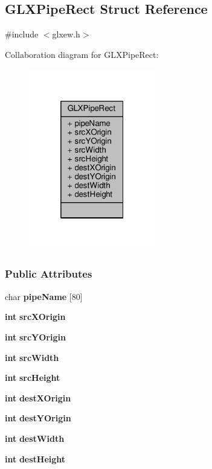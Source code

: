 \subsection{G\+L\+X\+Pipe\+Rect Struct Reference}
\label{structGLXPipeRect}


{\ttfamily \#include $<$glxew.\+h$>$}



Collaboration diagram for G\+L\+X\+Pipe\+Rect\+:
\nopagebreak
\begin{figure}[H]
\begin{center}
\leavevmode
\includegraphics[width=157pt]{d4/dcc/structGLXPipeRect__coll__graph}
\end{center}
\end{figure}
\subsubsection*{Public Attributes}
\begin{DoxyCompactItemize}
\item 
char {\bf pipe\+Name} [80]
\item 
{\bf int} {\bf src\+X\+Origin}
\item 
{\bf int} {\bf src\+Y\+Origin}
\item 
{\bf int} {\bf src\+Width}
\item 
{\bf int} {\bf src\+Height}
\item 
{\bf int} {\bf dest\+X\+Origin}
\item 
{\bf int} {\bf dest\+Y\+Origin}
\item 
{\bf int} {\bf dest\+Width}
\item 
{\bf int} {\bf dest\+Height}
\end{DoxyCompactItemize}


